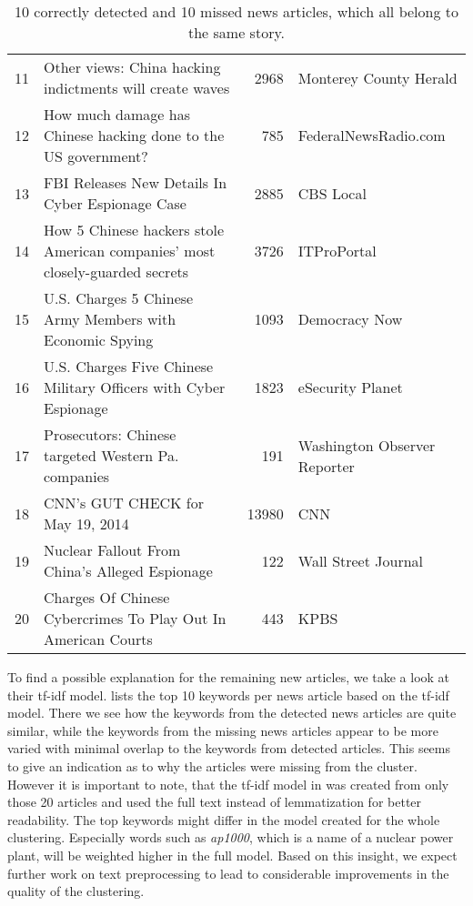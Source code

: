 \begin{table}[h]
{\begin{tabular}{rlrl}
            \hline
                11 & Other views: China hacking indictments will create waves                     &          2968 & Monterey County Herald       \\
                12 & How much damage has Chinese hacking done to the US government?               &           785 & FederalNewsRadio.com         \\
                13 & FBI Releases New Details In Cyber Espionage Case                             &          2885 & CBS Local                    \\
                14 & How 5 Chinese hackers stole American companies' most closely-guarded secrets &          3726 & ITProPortal                  \\
                15 & U.S. Charges 5 Chinese Army Members with Economic Spying                     &          1093 & Democracy Now                \\
                16 & U.S. Charges Five Chinese Military Officers with Cyber Espionage             &          1823 & eSecurity Planet             \\
                17 & Prosecutors: Chinese targeted Western Pa. companies                          &           191 & Washington Observer Reporter \\
                18 & CNN's GUT CHECK for May 19, 2014                                             &         13980 & CNN                  \\
                19 & Nuclear Fallout From China's Alleged Espionage                               &           122 & Wall Street Journal \\
                20 & Charges Of Chinese Cybercrimes To Play Out In American Courts                &           443 & KPBS               \\
                \hline
        \end{tabular}
    }
    \caption{10 correctly detected and 10 missed news articles, which all belong to the same story.}
    \label{tab:clustering_example}
\end{table}

To find a possible explanation for the remaining new articles, we take a look at their tf-idf model.
 lists the top 10 keywords per news article based on the tf-idf model.
There we see how the keywords from the detected news articles are quite similar,
while the keywords from the missing news articles appear to be more varied
with minimal overlap to the keywords from detected articles.
This seems to give an indication as to why the articles were missing from the cluster.
However it is important to note, that the tf-idf model in 
was created from only those 20 articles and used the full text instead of lemmatization for better readability.
The top keywords might differ in the model created for the whole clustering.
Especially words such as \textit{ap1000}, which is a name of a nuclear power plant,
will be weighted higher in the full model.
Based on this insight, we expect further work on text preprocessing
to lead to considerable improvements in the quality of the clustering.

